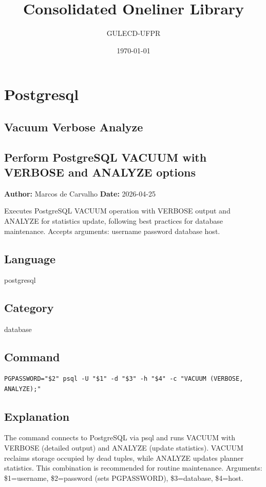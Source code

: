 \documentclass[openany]{book}
\title{Consolidated Oneliner Library}
\author{GULECD-UFPR}
\date{\today}
\begin{document}
\maketitle
\tableofcontents


\chapter{Postgresql}

\section{Vacuum Verbose Analyze}
\section*{Perform PostgreSQL VACUUM with VERBOSE and ANALYZE options}
\textbf{Author:} Marcos de Carvalho \hfill \textbf{Date:} 2026-04-25

\noindent Executes PostgreSQL VACUUM operation with VERBOSE output and ANALYZE for statistics update, following best practices for database maintenance. Accepts arguments: username password database host.

\section*{Language}
postgresql

\section*{Category}
database

\section*{Command}
\begin{lstlisting}
PGPASSWORD="$2" psql -U "$1" -d "$3" -h "$4" -c "VACUUM (VERBOSE, ANALYZE);"
\end{lstlisting}

\section*{Explanation}
The command connects to PostgreSQL via psql and runs VACUUM with VERBOSE (detailed output) and ANALYZE (update statistics). VACUUM reclaims storage occupied by dead tuples, while ANALYZE updates planner statistics. This combination is recommended for routine maintenance. Arguments: \$1=username, \$2=password (sets PGPASSWORD), \$3=database, \$4=host.
\end{document}
